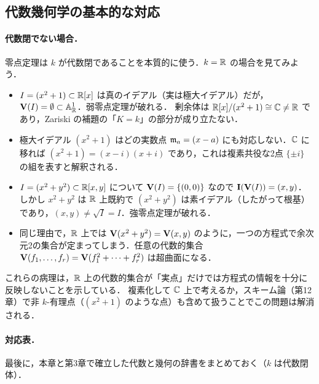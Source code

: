 \subsection{代数幾何学の基本的な対応}
\label{subsec:ch04-nonclosed}

\paragraph{代数閉でない場合．}
零点定理は $k$ が代数閉であることを本質的に使う．$k=\mathbb{R}$ の場合を見てみよう．
\begin{itemize}
  \item $I=(x^2+1)\subset\mathbb{R}[x]$ は真のイデアル（実は極大イデアル）だが，$\mathbf{V}(I)=\emptyset\subset\mathbb{A}^1_{\mathbb{R}}$．弱零点定理が破れる．
        剰余体は $\mathbb{R}[x]/(x^2+1)\cong\mathbb{C}\ne\mathbb{R}$ であり，Zariski の補題の「$K=k$」の部分が成り立たない．
  \item 極大イデアル $(x^2+1)$ はどの実数点 $\mathfrak{m}_a=(x-a)$ にも対応しない．$\mathbb{C}$ に移れば $(x^2+1)=(x-i)(x+i)$ であり，これは複素共役な2点 $\{\pm i\}$ の組を表すと解釈される．
  \item $I=(x^2+y^2)\subset\mathbb{R}[x,y]$ について $\mathbf{V}(I)=\{(0,0)\}$ なので $\mathbf{I}(\mathbf{V}(I))=(x,y)$．しかし $x^2+y^2$ は $\mathbb{R}$ 上既約で $(x^2+y^2)$ は素イデアル（したがって根基）であり，$(x,y)\ne\sqrt I=I$．強零点定理が破れる．
  \item 同じ理由で，$\mathbb{R}$ 上では $\mathbf{V}(x^2+y^2)=\mathbf{V}(x,y)$ のように，一つの方程式で余次元2の集合が定まってしまう．任意の代数的集合 $\mathbf{V}(f_1,\dots,f_r)=\mathbf{V}(f_1^2+\cdots+f_r^2)$ は超曲面になる．
\end{itemize}
これらの病理は，$\mathbb{R}$ 上の代数的集合が「実点」だけでは方程式の情報を十分に反映しないことを示している．
複素化して $\mathbb{C}$ 上で考えるか，スキーム論（第12章）で非 $k$-有理点（$(x^2+1)$ のような点）も含めて扱うことでこの問題は解消される．

\paragraph{対応表．}
最後に，本章と第3章で確立した代数と幾何の辞書をまとめておく（$k$ は代数閉体）．

